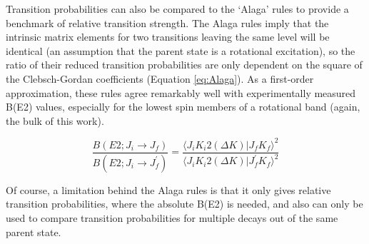 Transition probabilities can also be compared to the `Alaga' rules to provide a benchmark of relative transition strength. The Alaga rules imply that the intrinsic matrix elements for two transitions leaving the same level will be identical (an assumption that the parent state is a rotational excitation), so the ratio of their reduced transition probabilities are only dependent on the square of the Clebsch-Gordan coefficients (Equation \ref{eq:Alaga}). As a first-order approximation, these rules agree remarkably well with experimentally measured B(E2) values, especially for the lowest spin members of a rotational band (again, the bulk of this work). 

\begin{equation}\label{eq:Alaga} 
\frac{B(E2;J_i\rightarrow J_f)}{B(E2;J_i\rightarrow J_f^\prime)}=\frac{\langle J_i K_i 2 (\Delta K)\vert J_f K_f\rangle^2}{\langle J_i K_i 2 (\Delta K)\vert J_f^\prime K_f\rangle^2}
\end{equation}

Of course, a limitation behind the Alaga rules is that it only gives relative transition probabilities, where the absolute B(E2) is needed, and also can only be used to compare transition probabilities for multiple decays out of the same parent state. 
